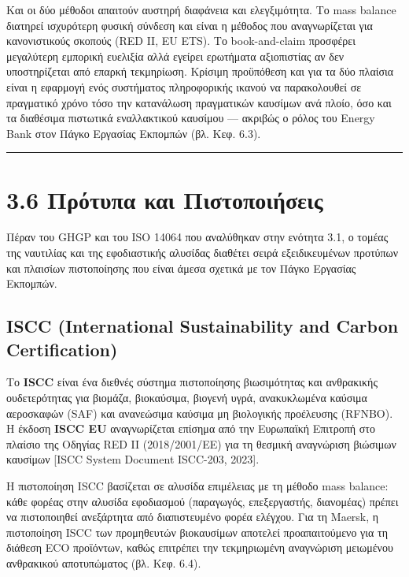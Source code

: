 Και οι δύο μέθοδοι απαιτούν αυστηρή διαφάνεια και ελεγξιμότητα. Το mass
balance διατηρεί ισχυρότερη φυσική σύνδεση και είναι η μέθοδος που
αναγνωρίζεται για κανονιστικούς σκοπούς (RED II, EU ETS). Το
book-and-claim προσφέρει μεγαλύτερη εμπορική ευελιξία αλλά εγείρει
ερωτήματα αξιοπιστίας αν δεν υποστηρίζεται από επαρκή τεκμηρίωση.
Κρίσιμη προϋπόθεση και για τα δύο πλαίσια είναι η εφαρμογή ενός
συστήματος πληροφορικής ικανού να παρακολουθεί σε πραγματικό χρόνο τόσο
την κατανάλωση πραγματικών καυσίμων ανά πλοίο, όσο και τα διαθέσιμα
πιστωτικά εναλλακτικού καυσίμου --- ακριβώς ο ρόλος του Energy Bank στον
Πάγκο Εργασίας Εκπομπών (βλ. Κεφ. 6.3).

\begin{center}\rule{0.5\linewidth}{0.5pt}\end{center}

\section{3.6 Πρότυπα και
Πιστοποιήσεις}\label{ux3c0ux3c1ux3ccux3c4ux3c5ux3c0ux3b1-ux3baux3b1ux3b9-ux3c0ux3b9ux3c3ux3c4ux3bfux3c0ux3bfux3b9ux3aeux3c3ux3b5ux3b9ux3c2}

Πέραν του GHGP και του ISO 14064 που αναλύθηκαν στην ενότητα 3.1, ο
τομέας της ναυτιλίας και της εφοδιαστικής αλυσίδας διαθέτει σειρά
εξειδικευμένων προτύπων και πλαισίων πιστοποίησης που είναι άμεσα
σχετικά με τον Πάγκο Εργασίας Εκπομπών.

\subsection{ISCC (International Sustainability and Carbon
Certification)}\label{iscc-international-sustainability-and-carbon-certification}

Το \textbf{ISCC} είναι ένα διεθνές σύστημα πιστοποίησης βιωσιμότητας και
ανθρακικής ουδετερότητας για βιομάζα, βιοκαύσιμα, βιογενή υγρά,
ανακυκλωμένα καύσιμα αεροσκαφών (SAF) και ανανεώσιμα καύσιμα μη
βιολογικής προέλευσης (RFNBO). Η έκδοση \textbf{ISCC EU} αναγνωρίζεται
επίσημα από την Ευρωπαϊκή Επιτροπή στο πλαίσιο της Οδηγίας RED II
(2018/2001/ΕΕ) για τη θεσμική αναγνώριση βιώσιμων καυσίμων {[}ISCC
System Document ISCC-203, 2023{]}.

Η πιστοποίηση ISCC βασίζεται σε αλυσίδα επιμέλειας με τη μέθοδο mass
balance: κάθε φορέας στην αλυσίδα εφοδιασμού (παραγωγός, επεξεργαστής,
διανομέας) πρέπει να πιστοποιηθεί ανεξάρτητα από διαπιστευμένο φορέα
ελέγχου. Για τη Maersk, η πιστοποίηση ISCC των προμηθευτών βιοκαυσίμων
αποτελεί προαπαιτούμενο για τη διάθεση ECO προϊόντων, καθώς επιτρέπει
την τεκμηριωμένη αναγνώριση μειωμένου ανθρακικού αποτυπώματος (βλ. Κεφ.
6.4).


